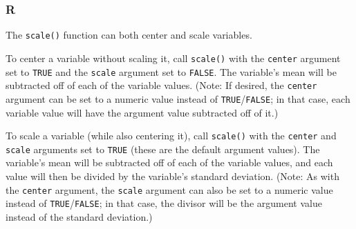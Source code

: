 \documentclass[
]{book}
\newenvironment{Shaded}{\begin{snugshade}}{\end{snugshade}}
\newcommand{\AttributeTok}[1]{\textcolor[rgb]{0.77,0.63,0.00}{#1}}
\newcommand{\DecValTok}[1]{\textcolor[rgb]{0.00,0.00,0.81}{#1}}
\newcommand{\FloatTok}[1]{\textcolor[rgb]{0.00,0.00,0.81}{#1}}
\newcommand{\FunctionTok}[1]{\textcolor[rgb]{0.00,0.00,0.00}{#1}}
\newcommand{\NormalTok}[1]{#1}
\newcommand{\OtherTok}[1]{\textcolor[rgb]{0.56,0.35,0.01}{#1}}
\newcommand{\SpecialCharTok}[1]{\textcolor[rgb]{0.00,0.00,0.00}{#1}}
\begin{document}
\hypertarget{r-38}{%
\subsubsection*{R}\label{r-38}}

The \texttt{scale()} function can both center and scale variables.

To center a variable without scaling it, call \texttt{scale()} with the \texttt{center} argument set to \texttt{TRUE} and the \texttt{scale} argument set to \texttt{FALSE}. The variable's mean will be subtracted off of each of the variable values. (Note: If desired, the \texttt{center} argument can be set to a numeric value instead of \texttt{TRUE}/\texttt{FALSE}; in that case, each variable value will have the argument value subtracted off of it.)

\begin{Shaded}
\end{Shaded}

To scale a variable (while also centering it), call \texttt{scale()} with the \texttt{center} and \texttt{scale} arguments set to \texttt{TRUE} (these are the default argument values). The variable's mean will be subtracted off of each of the variable values, and each value will then be divided by the variable's standard deviation. (Note: As with the \texttt{center} argument, the \texttt{scale} argument can also be set to a numeric value instead of \texttt{TRUE}/\texttt{FALSE}; in that case, the divisor will be the argument value instead of the standard deviation.)

\begin{Shaded}
\end{Shaded}
\end{document}
